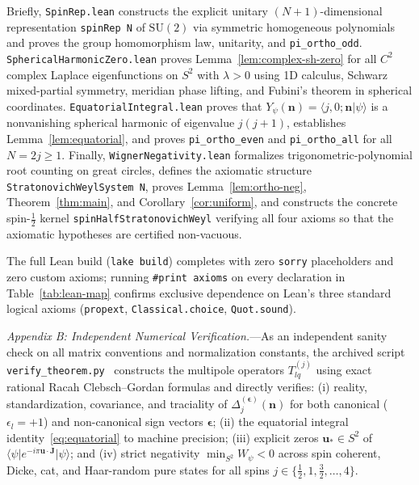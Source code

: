 \documentclass[aps,prl,reprint,amsmath,amssymb,nofootinbib,floatfix]{revtex4-2}
\newcommand{\ket}[1]{\lvert #1 \rangle}
\newcommand{\bra}[1]{\langle #1 \rvert}
\newcommand{\braket}[2]{\langle #1 \vert #2 \rangle}
\newcommand{\bn}{\mathbf{n}}
\newcommand{\bu}{\mathbf{u}}
\newcommand{\bJ}{\mathbf{J}}
\begin{document}
Briefly, {\footnotesize\texttt{SpinRep.lean}} constructs the explicit unitary $(N+1)$-dimensional representation {\footnotesize\texttt{spinRep N}} of $\mathrm{SU}(2)$ via symmetric homogeneous polynomials and proves the group homomorphism law, unitarity, and {\footnotesize\texttt{pi\_ortho\_odd}}. {\footnotesize\texttt{SphericalHarmonicZero.lean}} proves Lemma~\ref{lem:complex-sh-zero} for all $C^2$ complex Laplace eigenfunctions on $S^2$ with $\lambda > 0$ using 1D calculus, Schwarz mixed-partial symmetry, meridian phase lifting, and Fubini's theorem in spherical coordinates. {\footnotesize\texttt{EquatorialIntegral.lean}} proves that $Y_\psi(\bn) = \braket{j,0;\bn}{\psi}$ is a nonvanishing spherical harmonic of eigenvalue $j(j+1)$, establishes Lemma~\ref{lem:equatorial}, and proves {\footnotesize\texttt{pi\_ortho\_even}} and {\footnotesize\texttt{pi\_ortho\_all}} for all $N = 2j \ge 1$. Finally, {\footnotesize\texttt{WignerNegativity.lean}} formalizes trigonometric-polynomial root counting on great circles, defines the axiomatic structure {\footnotesize\texttt{StratonovichWeylSystem N}}, proves Lemma~\ref{lem:ortho-neg}, Theorem~\ref{thm:main}, and Corollary~\ref{cor:uniform}, and constructs the concrete spin-$\frac{1}{2}$ kernel {\footnotesize\texttt{spinHalfStratonovichWeyl}} verifying all four axioms so that the axiomatic hypotheses are certified non-vacuous.

The full Lean build ({\footnotesize\texttt{lake build}}) completes with zero {\footnotesize\texttt{sorry}} placeholders and zero custom axioms; running {\footnotesize\texttt{\#print axioms}} on every declaration in Table~\ref{tab:lean-map} confirms exclusive dependence on Lean's three standard logical axioms ({\footnotesize\texttt{propext}}, {\footnotesize\texttt{Classical.choice}}, {\footnotesize\texttt{Quot.sound}}).

\emph{Appendix B: Independent Numerical Verification.}---As an independent sanity check on all matrix conventions and normalization constants, the archived script {\footnotesize\texttt{verify\_theorem.py}}~\cite{Wang2026Zenodo} constructs the multipole operators $T^{(j)}_{lq}$ using exact rational Racah Clebsch--Gordan formulas and directly verifies: (i) reality, standardization, covariance, and traciality of $\Delta_j^{(\boldsymbol{\epsilon})}(\bn)$ for both canonical ($\epsilon_l = +1$) and non-canonical sign vectors $\boldsymbol{\epsilon}$; (ii) the equatorial integral identity~\eqref{eq:equatorial} to machine precision; (iii) explicit zeros $\bu_* \in S^2$ of $\bra{\psi}e^{-i\pi\bu\cdot\bJ}\ket{\psi}$; and (iv) strict negativity $\min_{S^2} W_\psi < 0$ across spin coherent, Dicke, cat, and Haar-random pure states for all spins $j \in \{\frac{1}{2}, 1, \frac{3}{2}, \dots, 4\}$.
\end{document}
